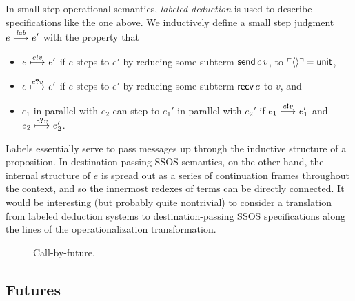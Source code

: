 In small-step operational
semantics, {\it labeled deduction} is used to describe specifications like
the one above. We inductively define a small step judgment 
$e ~{\stackrel{\footnotesize{\it lab}}{\longmapsto}}~
e'$ with the property that
\begin{itemize}
\item $e ~{\stackrel{\footnotesize{c{\textbf{!}}v}}{\longmapsto}}~
e'$ if $e$ steps to $e'$ by reducing some subterm ${\sf send}\,c\,v$,
to ${\ulcorner{\langle\rangle}\urcorner} = {\sf unit}$,
\item $e
~{\stackrel{\footnotesize{c{\textbf{?}}v}}{\longmapsto}}~ e'$ if $e$
steps to $e'$ by reducing some subterm ${\sf recv}\,c$ to $v$, and 
\item $e_1$ in parallel with $e_2$ can step to $e_1'$
in parallel with $e_2'$ if $e_1
~{\stackrel{\footnotesize{c{\textbf{!}}v}}{\longmapsto}}~ e_1'$ and
$e_2 ~{\stackrel{\footnotesize{c{\textbf{?}}v}}{\longmapsto}}~ e_2'$.
\end{itemize}
Labels essentially serve to pass messages up through the inductive
structure of a proposition.  In destination-passing SSOS semantics, on
the other hand, the internal structure of $e$ is spread out as a
series of continuation frames throughout the context, and so the
innermost redexes of terms can be directly connected. It would be
interesting (but probably quite nontrivial) to consider a translation
from labeled deduction systems to destination-passing SSOS
specifications along the lines of the operationalization
transformation.


\begin{figure}
\caption{Call-by-future.}
\label{fig:dest-futures}
\end{figure}

\subsection{Futures}
\label{sec:dest-futures}

